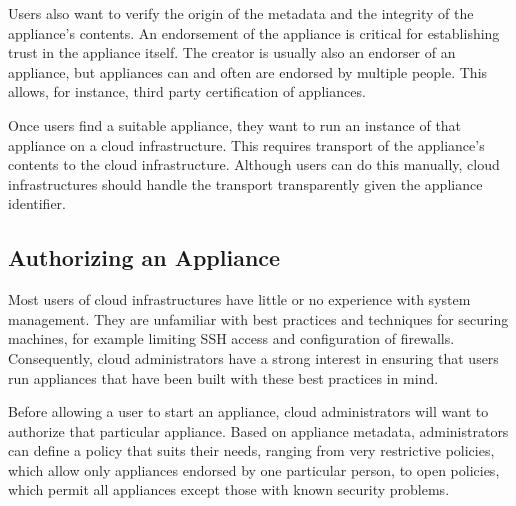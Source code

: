 Users also want to verify the origin of the metadata and the integrity
of the appliance's contents.  An endorsement of the appliance is
critical for establishing trust in the appliance itself.  The creator
is usually also an endorser of an appliance, but appliances can and
often are endorsed by multiple people.  This allows, for instance,
third party certification of appliances.

Once users find a suitable appliance, they want to run an instance of
that appliance on a cloud infrastructure.  This requires transport of
the appliance's contents to the cloud infrastructure.  Although users
can do this manually, cloud infrastructures should handle the
transport transparently given the appliance identifier.

\subsection{Authorizing an Appliance}

Most users of cloud infrastructures have little or no experience with
system management.  They are unfamiliar with best practices and
techniques for securing machines, for example limiting SSH access and
configuration of firewalls.  Consequently, cloud administrators have a
strong interest in ensuring that users run appliances that have been
built with these best practices in mind.

Before allowing a user to start an appliance, cloud administrators
will want to authorize that particular appliance.  Based on appliance
metadata, administrators can define a policy that suits their needs,
ranging from very restrictive policies, which allow only appliances
endorsed by one particular person, to open policies, which permit all
appliances except those with known security problems.
